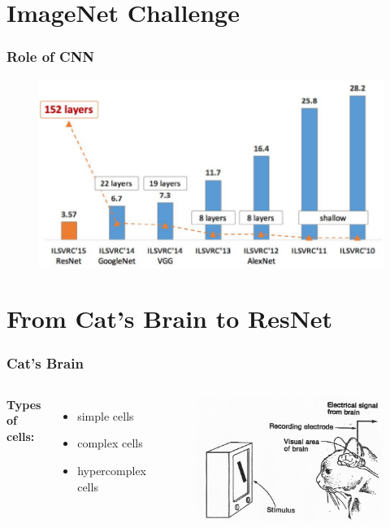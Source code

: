 \documentclass{beamer}
\begin{document}
\section{ImageNet Challenge}
\begin{frame}
\frametitle{Role of CNN}
\begin{figure}
	\includegraphics[width=\linewidth]{Pics/imagenet_acc.png}
\end{figure}
\end{frame}

\section{From Cat's Brain to ResNet}
\begin{frame}
\frametitle{Cat's Brain}
\begin{columns}[c]
	\textbf{Types of cells:}
\begin{itemize}
	\item simple cells
	\item complex cells
	\item hypercomplex cells
\end{itemize}

\begin{figure}
	\includegraphics[width=\linewidth]{Pics/cats.jpg}
\end{figure}
\end{columns}
\end{frame}
\end{document}
